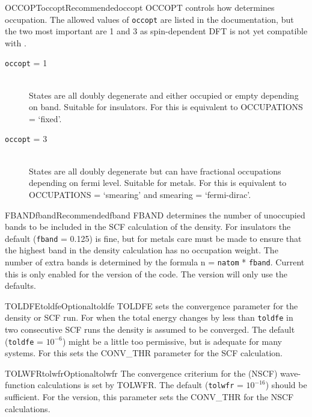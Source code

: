 \documentclass[11pt]{report}
\begin{document}
\begin{Card}{OCCOPT}{occopt}{Recommended}{occopt}
OCCOPT controls how  determines occupation. The allowed values of \texttt{occopt} are listed in the  documentation, but the two most important are 1 and 3 as spin-dependent DFT is not yet compatible with .
\begin{description}
\item[\texttt{occopt} = 1]\hfill\\ States are all doubly degenerate and either occupied or empty depending on band. Suitable for insulators. 
	For  this is equivalent to  OCCUPATIONS = `fixed'.
\item[\texttt{occopt} = 3]\hfill\\ States are all doubly degenerate but can have fractional occupations depending on fermi level. Suitable for metals. For  this is equivalent to OCCUPATIONS = `smearing' and smearing = `fermi-dirac'.
\end{description}
\end{Card}

\begin{Card}{FBAND}{fband}{Recommended}{fband}
FBAND determines the number of unoccupied bands to be included in the SCF calculation of the density. For insulators the default (\texttt{fband} = 0.125) is fine, but for metals care must be made to ensure that the highest band in the density calculation has no occupation weight. The number of extra bands is determined by the formula n = \texttt{natom} * \texttt{fband}. Current this is only enabled for the  version of the code. The  version will only use the defaults. 
\end{Card}


\begin{Card}{TOLDFE}{toldfe}{Optional}{toldfe}
TOLDFE sets the convergence parameter for the density or SCF run. For  when the total energy changes by less than \texttt{toldfe} in two consecutive SCF runs the density is assumed to be converged. The default (\texttt{toldfe} = $10^{-6}$) might be a little too permissive, but is adequate for many systems. For  this sets the CONV\_THR parameter for the SCF calculation. 
\end{Card}

\begin{Card}{TOLWFR}{tolwfr}{Optional}{tolwfr}
The convergence criterium for the (NSCF) wave-function calculations is set by TOLWFR. The default (\texttt{tolwfr} = $10^{-16}$) should be sufficient. For the  version, this parameter sets the CONV\_THR for the NSCF calculations. 
\end{Card}
\end{document}
